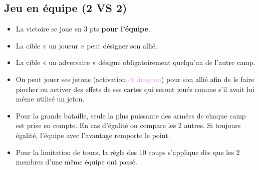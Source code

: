 \documentclass[10pt, a4paper]{article}	%
\begin{document}
\begin{multicols}{3}
\subsection*{Jeu en équipe (2 VS 2)}
\begin{itemize}
	\item La victoire se joue en 3 pts \textbf{pour l’équipe}.
	\item La cible « un joueur » peut désigner son allié.
	\item La cible « un adversaire » désigne obligatoirement quelqu’un de l’autre camp.
	\item On peut jouer ses jetons (activation \textcolor{Plum}{et dragoon}) pour son allié afin de le faire piocher ou activer des effets de ses cartes qui seront joués comme s’il avait lui même utilisé un jeton.
	\item Pour la grande bataille, seule la plus puissante des armées de chaque camp est prise en compte. En cas d’égalité on compare les 2 autres. Si toujours égalité, l’équipe avec l’avantage remporte le point.
	\item Pour la limitation de tours, la règle des 10 coups s’applique dès que les 2 membres d’une même équipe ont passé.
\end{itemize}




\end{multicols}
\end{document}
